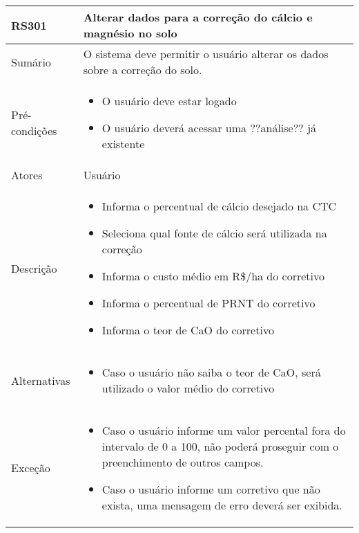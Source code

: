 \begin{quadro}[!htb]
    \begin{tabular}{|p{3cm}|p{11cm}|}
        \hline
        \textbf{RS301} & \textbf{Alterar dados para a correção do cálcio e magnésio no solo} \\
        \hline
        Sumário        & O sistema deve permitir o usuário alterar os dados sobre a correção do solo.                  \\
        \hline
        Pré-condições  & \begin{itemize}
            \item O usuário deve estar logado
            \item O usuário deverá acessar uma ??análise?? já existente 
        \end{itemize}                 \\
        \hline
        Atores         & Usuário                  \\
        \hline
        Descrição      &
        \begin{itemize}
            \item Informa o percentual de cálcio desejado na CTC
            \item Seleciona qual fonte de cálcio será utilizada na correção
            \item Informa o custo médio em R\$/ha do corretivo
            \item Informa o percentual de PRNT do corretivo
            \item Informa o teor de CaO do corretivo
        \end{itemize}                 \\
        \hline
        Alternativas   &
        \begin{itemize}
            \item Caso o usuário não saiba o teor de CaO, será utilizado o valor médio do corretivo
        \end{itemize}                 \\
        \hline
        Exceção        &
        \begin{itemize}
            \item Caso o usuário informe um valor percental fora do intervalo de 0 a 100, não poderá proseguir com o preenchimento de outros campos.
            \item Caso o usuário informe um corretivo que não exista, uma mensagem de erro deverá ser exibida.
        \end{itemize}                   \\
        \hline
    \end{tabular}
\end{quadro}

